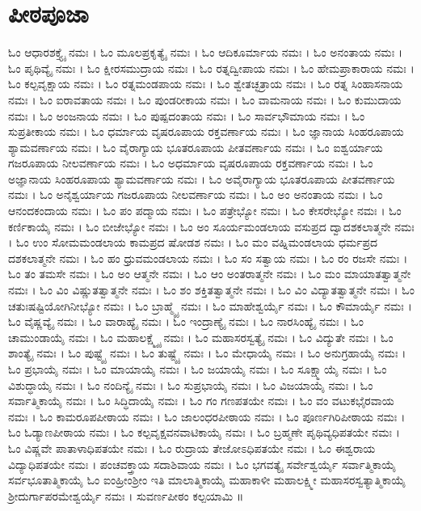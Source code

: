 \section{ಪೀಠಪೂಜಾ}
 ಓಂ ಆಧಾರಶಕ್ತ್ಯೈ ನಮಃ । ಓಂ ಮೂಲಪ್ರಕೃತ್ಯೈ ನಮಃ । ಓಂ ಆದಿಕೂರ್ಮಾಯ ನಮಃ । ಓಂ ಅನಂತಾಯ ನಮಃ । ಓಂ ಪೃಥಿವ್ಯೈ ನಮಃ । ಓಂ ಕ್ಷೀರಸಮುದ್ರಾಯ ನಮಃ । ಓಂ ರತ್ನದ್ವೀಪಾಯ ನಮಃ । ಓಂ ಹೇಮಪ್ರಾಕಾರಾಯ ನಮಃ । ಓಂ ಕಲ್ಪವೃಕ್ಷಾಯ ನಮಃ । ಓಂ ರತ್ನಮಂಡಪಾಯ ನಮಃ । ಓಂ ಶ್ವೇತಚ್ಛತ್ರಾಯ ನಮಃ । ಓಂ ರತ್ನ ಸಿಂಹಾಸನಾಯ ನಮಃ । ಓಂ ಐರಾವತಾಯ ನಮಃ । ಓಂ ಪುಂಡರೀಕಾಯ ನಮಃ । ಓಂ ವಾಮನಾಯ ನಮಃ । ಓಂ ಕುಮುದಾಯ ನಮಃ । ಓಂ ಅಂಜನಾಯ ನಮಃ । ಓಂ ಪುಷ್ಪದಂತಾಯ ನಮಃ । ಓಂ ಸಾರ್ವಭೌಮಾಯ ನಮಃ । ಓಂ ಸುಪ್ರತೀಕಾಯ ನಮಃ ।  ಓಂ  ಧರ್ಮಾಯ  ವೃಷರೂಪಾಯ  ರಕ್ತವರ್ಣಾಯ ನಮಃ ।  ಓಂ ಜ್ಞಾನಾಯ  ಸಿಂಹರೂಪಾಯ ಶ್ಯಾಮವರ್ಣಾಯ ನಮಃ ।  ಓಂ ವೈರಾಗ್ಯಾಯ  ಭೂತರೂಪಾಯ  ಪೀತವರ್ಣಾಯ ನಮಃ ।   ಓಂ ಐಶ್ವರ್ಯಾಯ  ಗಜರೂಪಾಯ  ನೀಲವರ್ಣಾಯ ನಮಃ । ಓಂ ಅಧರ್ಮಾಯ ವೃಷರೂಪಾಯ  ರಕ್ತವರ್ಣಾಯ ನಮಃ ।  ಓಂ ಅಜ್ಞಾನಾಯ ಸಿಂಹರೂಪಾಯ ಶ್ಯಾಮವರ್ಣಾಯ ನಮಃ ।  ಓಂ ಅವೈರಾಗ್ಯಾಯ ಭೂತರೂಪಾಯ ಪೀತವರ್ಣಾಯ ನಮಃ ।  ಓಂ ಅನೈಶ್ವರ್ಯಾಯ ಗಜರೂಪಾಯ ನೀಲವರ್ಣಾಯ ನಮಃ ।  ಓಂ ಅಂ ಅನಂತಾಯ ನಮಃ । ಓಂ ಆನಂದಕಂದಾಯ ನಮಃ । ಓಂ ಪಂ ಪದ್ಮಾಯ ನಮಃ । ಓಂ ಪತ್ರೇಭ್ಯೋ ನಮಃ । ಓಂ ಕೇಸರೇಭ್ಯೋ ನಮಃ । ಓಂ ಕರ್ಣಿಕಾಯೈ ನಮಃ । ಓಂ ಬೀಜೇಭ್ಯೋ ನಮಃ ।  ಓಂ ಅಂ ಸೂರ್ಯಮಂಡಲಾಯ ವಸುಪ್ರದ ದ್ವಾದಶಕಲಾತ್ಮನೇ ನಮಃ । ಓಂ ಉಂ ಸೋಮಮಂಡಲಾಯ ಕಾಮಪ್ರದ ಷೋಡಶ ನಮಃ । ಓಂ ಮಂ ವಹ್ನಿಮಂಡಲಾಯ ಧರ್ಮಪ್ರದ ದಶಕಲಾತ್ಮನೇ ನಮಃ । ಓಂ ಹಂ ಧ್ರುವಮಂಡಲಾಯ ನಮಃ । ಓಂ ಸಂ ಸತ್ವಾಯ ನಮಃ । ಓಂ ರಂ ರಜಸೇ ನಮಃ । ಓಂ ತಂ ತಮಸೇ ನಮಃ । ಓಂ ಅಂ ಆತ್ಮನೇ ನಮಃ । ಓಂ ಆಂ ಅಂತರಾತ್ಮನೇ ನಮಃ । ಓಂ ಮಂ ಮಾಯಾತತ್ವಾತ್ಮನೇ ನಮಃ । ಓಂ ವಿಂ ವಿಷ್ಣುತತ್ವಾತ್ಮನೇ ನಮಃ । ಓಂ ಶಂ ಶಕ್ತಿತತ್ವಾತ್ಮನೇ ನಮಃ । ಓಂ ವಿಂ ವಿದ್ಯಾತತ್ವಾತ್ಮನೇ ನಮಃ । ಓಂ ಚತುಃಷಷ್ಟಿಯೋಗಿನೀಭ್ಯೋ ನಮಃ । ಓಂ ಬ್ರಾಹ್ಮ್ಯೈ ನಮಃ । ಓಂ ಮಾಹೇಶ್ವರ್ಯೈ ನಮಃ । ಓಂ ಕೌಮಾರ್ಯೈ ನಮಃ । ಓಂ ವೈಷ್ಣವ್ಯೈ ನಮಃ । ಓಂ ವಾರಾಹ್ಯೈ ನಮಃ । ಓಂ ಇಂದ್ರಾಣ್ಯೈ ನಮಃ । ಓಂ ನಾರಸಿಂಹ್ಯೈ ನಮಃ । ಓಂ ಚಾಮುಂಡಾಯೈ ನಮಃ । ಓಂ ಮಹಾಲಕ್ಷ್ಮ್ಯೈ ನಮಃ । ಓಂ ಮಹಾಸರಸ್ವತ್ಯೈ ನಮಃ । ಓಂ ವಿದ್ಯುತೇ ನಮಃ । ಓಂ ಶಾಂತ್ಯೈ ನಮಃ । ಓಂ ಪುಷ್ಟ್ಯೈ ನಮಃ । ಓಂ ತುಷ್ಟ್ಯೈ ನಮಃ । ಓಂ ಮೇಧಾಯೈ ನಮಃ । ಓಂ ಅನುಗ್ರಹಾಯೈ ನಮಃ । ಓಂ ಪ್ರಭಾಯೈ ನಮಃ । ಓಂ ಮಾಯಾಯೈ ನಮಃ । ಓಂ ಜಯಾಯೈ ನಮಃ । ಓಂ ಸೂಕ್ಷ್ಮಾಯೈ ನಮಃ । ಓಂ ವಿಶುದ್ಧಾಯೈ ನಮಃ । ಓಂ ನಂದಿನ್ಯೈ ನಮಃ । ಓಂ ಸುಪ್ರಭಾಯೈ ನಮಃ । ಓಂ ವಿಜಯಾಯೈ ನಮಃ । ಓಂ ಸರ್ವಾತ್ಮಿಕಾಯೈ ನಮಃ । ಓಂ ಸಿದ್ಧಿದಾಯೈ ನಮಃ । ಓಂ ಗಂ ಗಣಪತಯೇ ನಮಃ । ಓಂ ವಂ ವಟುಕಭೈರವಾಯ ನಮಃ । ಓಂ ಕಾಮರೂಪಪೀಠಾಯ ನಮಃ । ಓಂ ಜಾಲಂಧರಪೀಠಾಯ ನಮಃ । ಓಂ ಪೂರ್ಣಗಿರಿಪೀಠಾಯ ನಮಃ । ಓಂ ಓಡ್ಯಾಣಪೀಠಾಯ ನಮಃ । ಓಂ ಕಲ್ಪವೃಕ್ಷವನವಾಟಿಕಾಯೈ ನಮಃ । ಓಂ ಬ್ರಹ್ಮಣೇ ಪೃಥಿವ್ಯಧಿಪತಯೇ ನಮಃ । ಓಂ ವಿಷ್ಣವೇ ಪಾತಾಳಾಧಿಪತಯೇ ನಮಃ । ಓಂ ರುದ್ರಾಯ ತೇಜೋಽಧಿಪತಯೇ ನಮಃ । ಓಂ ಈಶ್ವರಾಯ ವಿದ್ಯಾಧಿಪತಯೇ ನಮಃ । ಪಂಚವಕ್ತ್ರಾಯ ಸದಾಶಿವಾಯ ನಮಃ । ಓಂ ಭಗವತ್ಯೈ ಸರ್ವೇಶ್ವರ್ಯೈ  ಸರ್ವಾತ್ಮಿಕಾಯೈ ಸರ್ವಭೂತಾತ್ಮಿಕಾಯೈ ಓಂ ಐಂಹ್ರೀಂಶ್ರೀಂ ಇತಿ ಮಾಲಾತ್ಮಿಕಾಯೈ ಮಹಾಕಾಳೀ ಮಹಾಲಕ್ಷ್ಮೀ ಮಹಾಸರಸ್ವತ್ಯಾತ್ಮಿಕಾಯೈ ಶ್ರೀದುರ್ಗಾಪರಮೇಶ್ವರ್ಯೈ ನಮಃ । ಸುವರ್ಣಪೀಠಂ ಕಲ್ಪಯಾಮಿ ॥
\newpage
